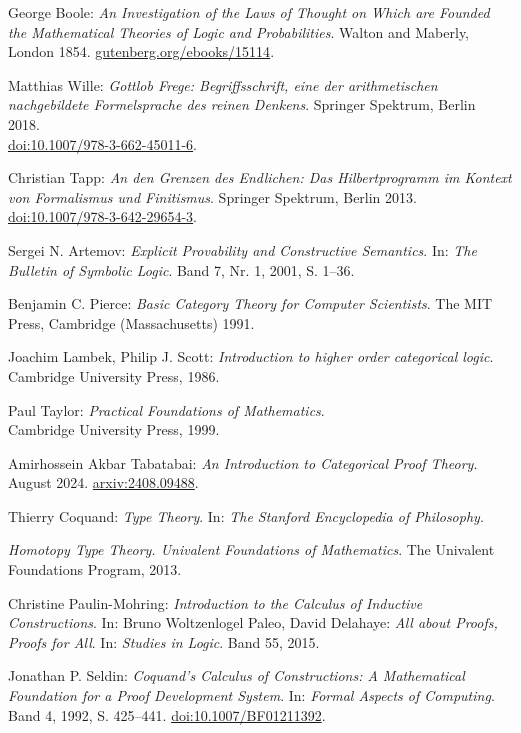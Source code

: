 \begin{thebibliography}{00}
 George Boole:
\emph{An Investigation of the Laws of Thought on Which are Founded the
Mathematical Theories of Logic and Probabilities}.
Walton and Maberly, London 1854.
\href{https://gutenberg.org/ebooks/15114}{gutenberg.org/ebooks/15114}.

 Matthias Wille:
\emph{Gottlob Frege: Begriffsschrift, eine der arithmetischen
nachgebildete Formelsprache des reinen Denkens}.
Springer Spektrum, Berlin 2018.\\
\href{https://doi.org/10.1007/978-3-662-45011-6}{doi:10.1007/978-3-662-45011-6}.

 Christian Tapp:
\emph{An den Grenzen des Endlichen: Das Hilbertprogramm im Kontext
von Formalismus und Finitismus}. Springer Spektrum, Berlin 2013.\\
\href{https://doi.org/10.1007/978-3-642-29654-3}{doi:10.1007/978-3-642-29654-3}.

 Sergei N. Artemov:
\emph{Explicit Provability and Constructive Semantics}.
In: \emph{The Bulletin of Symbolic Logic}. Band 7, Nr. 1, 2001, S. 1--36.

 Benjamin C. Pierce:
\emph{Basic Category Theory for Computer Scientists}.
The MIT Press, Cambridge (Massachusetts) 1991.

 Joachim Lambek, Philip J. Scott:
\emph{Introduction to higher order categorical logic}.
Cambridge University Press, 1986.

 Paul Taylor:
\emph{Practical Foundations of Mathematics}.\\
Cambridge University Press, 1999.

 Amirhossein Akbar Tabatabai:
\emph{An Introduction to Categorical Proof Theory}.\\
August 2024. \href{https://arxiv.org/abs/2408.09488}{arxiv:2408.09488}.

 Thierry Coquand:
\emph{Type Theory}. In: \emph{The Stanford Encyclopedia of Philosophy}.

\emph{Homotopy Type Theory. Univalent Foundations of Mathematics}.
The Univalent Foundations Program, 2013.

 Christine Paulin-Mohring:
\emph{Introduction to the Calculus of Inductive Constructions}. In:
Bruno Woltzenlogel Paleo, David Delahaye: \emph{All about Proofs, Proofs for All}.
In: \emph{Studies in Logic}. Band 55, 2015.

 Jonathan P. Seldin:
\emph{Coquand's Calculus of Constructions: A Mathematical Foundation
for a Proof Development System}. In: \emph{Formal Aspects of Computing}.
Band 4, 1992, S. 425--441.
\href{https://doi.org/10.1007/BF01211392}{doi:10.1007/BF01211392}.


\end{thebibliography}
